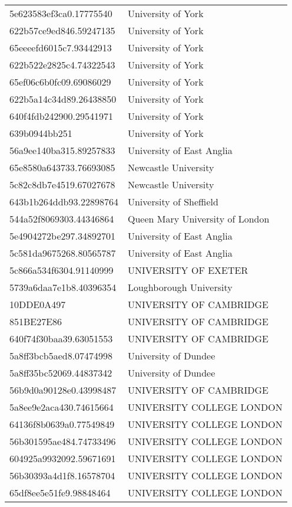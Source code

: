 \begin{tabular}{ll}
5e623583ef3ca0.17775540 & University of York \\
622b57ce9ed846.59247135 & University of York \\
65eeeefd6015c7.93442913 & University of York \\
622b522e2825c4.74322543 & University of York \\
65ef06c6b0fc09.69086029 & University of York \\
622b5a14c34d89.26438850 & University of York \\
640f4fdb242900.29541971 & University of York \\
639b0944bb251 & University of York \\
56a9ee140ba315.89257833 & University of East Anglia \\
65e8580a643733.76693085 & Newcastle University \\
5c82c8db7e4519.67027678 & Newcastle University \\
643b1b264ddb93.22898764 & University of Sheffield \\
544a52f8069303.44346864 & Queen Mary University of London \\
5e4904272be297.34892701 & University of East Anglia \\
5c581da9675268.80565787 & University of East Anglia \\
5c866a534f6304.91140999 & UNIVERSITY OF EXETER \\
5739a6daa7e1b8.40396354 & Loughborough University \\
10DDE0A497 & UNIVERSITY OF CAMBRIDGE \\
851BE27E86 & UNIVERSITY OF CAMBRIDGE \\
640f74f30baa39.63051553 & UNIVERSITY OF CAMBRIDGE \\
5a8ff3bcb5aed8.07474998 & University of Dundee \\
5a8ff35bc52069.44837342 & University of Dundee \\
56b9d0a90128e0.43998487 & UNIVERSITY OF CAMBRIDGE \\
5a8ee9e2aca430.74615664 & UNIVERSITY COLLEGE LONDON \\
64136f8b0639a0.77549849 & UNIVERSITY COLLEGE LONDON \\
56b301595ae484.74733496 & UNIVERSITY COLLEGE LONDON \\
604925a9932092.59671691 & UNIVERSITY COLLEGE LONDON \\
56b30393a4d1f8.16578704 & UNIVERSITY COLLEGE LONDON \\
65df8ee5e51fe9.98848464 & UNIVERSITY COLLEGE LONDON \\

\end{tabular}
